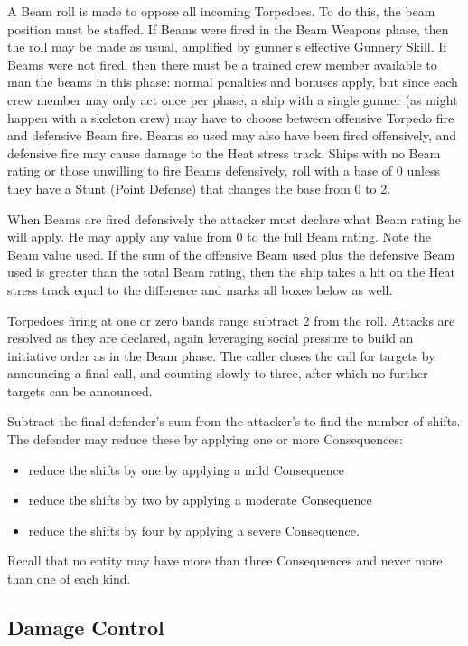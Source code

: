 A Beam roll is made to oppose all incoming Torpedoes. To do this, the beam position must be staffed. If Beams were fired in the Beam Weapons phase, then the roll may be made as usual, amplified by gunner's effective Gunnery Skill. If Beams were not fired, then there must be a trained crew member available to man the beams in this phase: normal penalties and bonuses apply, but since each crew member may only act once per phase, a ship with a single gunner (as might happen with a skeleton crew) may have to choose between offensive Torpedo fire and defensive Beam fire. Beams so used may also have been fired offensively, and defensive fire may cause damage to the Heat stress track. Ships with no Beam rating or those unwilling to fire Beams defensively, roll with a base of 0 unless they have a Stunt (Point Defense) that changes the base from 0 to 2.


When Beams are fired defensively the attacker must declare what Beam rating he will apply. He may apply any value from 0 to the full Beam rating. Note the Beam value used. If the sum of the offensive Beam used plus the defensive Beam used is greater than the total Beam rating, then the ship takes a hit on the Heat stress track equal to the difference and marks all boxes below as well.

Torpedoes firing at one or zero bands range subtract 2 from the roll. Attacks are resolved as they are declared, again leveraging social pressure to build an initiative order as in the Beam phase. The caller closes the call for targets by announcing a final call, and counting slowly to three, after which no further targets can be announced.

Subtract the final defender's sum from the attacker's to find the number of shifts. The defender may reduce these by applying one or more Consequences:
\begin{itemize}
\item reduce the shifts by one by applying a mild Consequence
\item reduce the shifts by two by applying a moderate Consequence
\item reduce the shifts by four by applying a severe Consequence.
\end{itemize}

Recall that no entity may have more than three Consequences and never more than one of each kind.


\subsection{Damage Control}
\label{sec:Damage Control}

